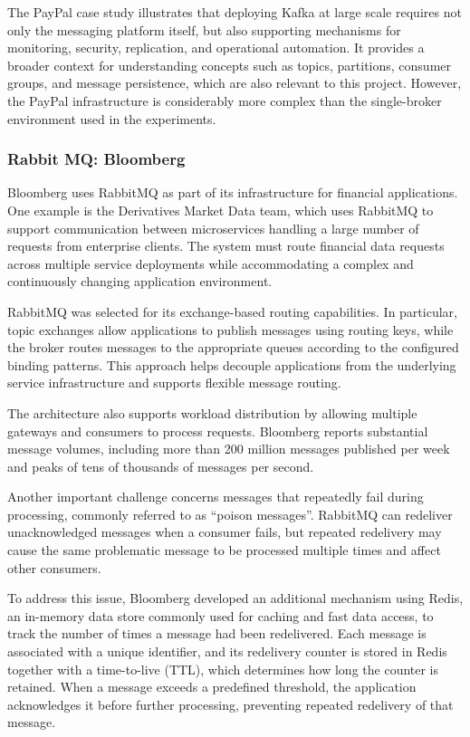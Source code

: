 \documentclass{scrartcl}
\begin{document}
The PayPal case study illustrates that deploying Kafka at large scale requires not only the messaging platform itself, but also supporting mechanisms for monitoring, security, replication, and operational automation. It provides a broader context for understanding concepts such as topics, partitions, consumer groups, and message persistence, which are also relevant to this project. However, the PayPal infrastructure is considerably more complex than the single-broker environment used in the experiments. 

\subsubsection{Rabbit MQ: Bloomberg}
Bloomberg uses RabbitMQ as part of its infrastructure for financial applications. One example is the Derivatives Market Data team, which uses RabbitMQ to support communication between microservices handling a large number of requests from enterprise clients. The system must route financial data requests across multiple service deployments while accommodating a complex and continuously changing application environment.

RabbitMQ was selected for its exchange-based routing capabilities. In particular, topic exchanges allow applications to publish messages using routing keys, while the broker routes messages to the appropriate queues according to the configured binding patterns. This approach helps decouple applications from the underlying service infrastructure and supports flexible message routing.

The architecture also supports workload distribution by allowing multiple gateways and consumers to process requests. Bloomberg reports substantial message volumes, including more than 200 million messages published per week and peaks of tens of thousands of messages per second. 

Another important challenge concerns messages that repeatedly fail during processing, commonly referred to as ``poison messages''. RabbitMQ can redeliver unacknowledged messages when a consumer fails, but repeated redelivery may cause the same problematic message to be processed multiple times and affect other consumers.

To address this issue, Bloomberg developed an additional mechanism using Redis, an in-memory data store commonly used for caching and fast data access, to track the number of times a message had been redelivered. Each message is associated with a unique identifier, and its redelivery counter is stored in Redis together with a time-to-live (TTL), which determines how long the counter is retained. When a message exceeds a predefined threshold, the application acknowledges it before further processing, preventing repeated redelivery of that message.
\end{document}
